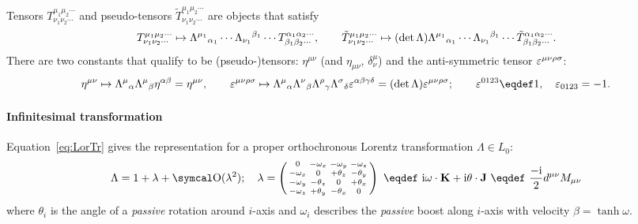 \documentclass[CheatSheet]{subfiles}
\begin{document}
Tensors $T^{\mu_1\mu_2\cdots}_{\nu_1\nu_2\cdots}$ and pseudo-tensors $\tilde T^{\mu_1\mu_2\cdots}_{\nu_1\nu_2\cdots}$ are objects that satisfy
\begin{equation}
 T^{\mu_1\mu_2\cdots}_{\nu_1\nu_2\cdots}\mapsto
\Lambda^{\mu_1}{}_{\alpha_1}\cdots
\Lambda_{\nu_1}{}^{\beta_1}\cdots
 T^{\alpha_1\alpha_2\cdots}_{\beta_1\beta_2\cdots},
\qquad
 \tilde T^{\mu_1\mu_2\cdots}_{\nu_1\nu_2\cdots}\mapsto(\det\Lambda)
\Lambda^{\mu_1}{}_{\alpha_1}\cdots
\Lambda_{\nu_1}{}^{\beta_1}\cdots
 \tilde T^{\alpha_1\alpha_2\cdots}_{\beta_1\beta_2\cdots}.
\end{equation}
There are two constants that qualify to be (pseudo-)tensors: $\eta^{\mu\nu}$ (and $\eta_{\mu\nu}$, $\delta^{\mu}_\nu$) and the anti-symmetric tensor $\varepsilon^{\mu\nu\rho\sigma}$:
\begin{equation}
\eta^{\mu\nu}\mapsto \LorTr\mu\alpha\LorTr\mu\beta\eta^{\alpha\beta}=\eta^{\mu\nu},\qquad
 \vep^{\mu\nu\rho\sigma}\mapsto \LorTr\mu\alpha\LorTr\nu\beta\LorTr\rho\gamma\LorTr\sigma\delta\vep^{\alpha\beta\gamma\delta}=(\det\Lambda)\vep^{\mu\nu\rho\sigma};\qquad
 \vep^{0123}\eqdef1,\quad \vep_{0123}=-1.
\end{equation}

\paragraph{Infinitesimal transformation}
Equation~\eqref{eq:LorTr} gives the representation for a proper orthochronous Lorentz transformation $\Lambda\in L_0$:
\begin{equation}
 \Lambda= 1 + \lambda + \Order(\lambda^2);\quad
\lambda=\spmat{
 0 & -\omega_x & -\omega_y & -\omega_z \\
 -\omega_x & 0        &+\theta_z &-\theta_y\\
 -\omega_y &-\theta_z & 0        &+\theta_x\\
 -\omega_z &+\theta_y &-\theta_x & 0
}
~\eqdef~
\ii\vc{\omega}\cdot\vc K+\ii\vc\theta\cdot\vc J
~\eqdef~
\frac{-\ii}{2}d^{\mu\nu}M_{\mu\nu}
\label{eq:LorTrInf}
\end{equation}
where $\theta_i$ is the angle of a \emph{passive} rotation around $i$-axis and $\omega_i$ describes the \emph{passive} boost along $i$-axis with velocity $\beta=\tanh\omega$.
\end{document}
